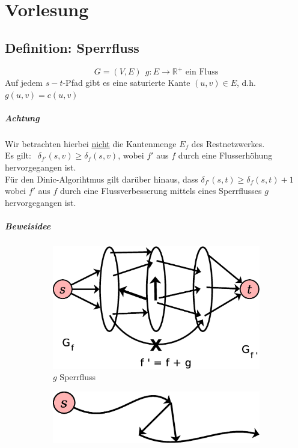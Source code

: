 \chapter{Vorlesung}
\section{Definition: Sperrfluss}
\[ G=(V,E)~~g:E\rightarrow\mathbb{R}^+\text{ ein Fluss} \]
Auf jedem $s-t$-Pfad gibt es eine saturierte Kante $(u,v)\in E$, d.h. $g(u,v)=c(u,v)$
\paragraph{Achtung}
Wir betrachten hierbei \underline{nicht} die Kantenmenge $E_f$ des Restnetzwerkes.\\
Es gilt: $~~\delta_{f'}(s,v)\geq \delta_f(s,v)$, wobei $f'$ aus $f$ durch eine Flusserhöhung hervorgegangen ist.\\
Für den Dinic-Algorihtmus gilt darüber hinaus, dass $\delta_{f'}(s,t) \geq \delta_f(s,t)+1$ wobei $f'$ aus $f$ durch eine Flussverbesserung mittels eines Sperrflusses $g$ hervorgegangen ist.
\paragraph{Beweisidee}
\begin{figure}[h]
\centering
\begin{subfigure}[H]{0.4\linewidth}
	\centering
\includegraphics[width=\linewidth]{27/Grafik/Diagramm2}
\caption{$g$ Sperrfluss}
\label{fig:Diagramm2}
\end{subfigure}
\hspace*{60pt}
\begin{subfigure}[H]{0.4\linewidth}
	\centering
	\includegraphics[width=\linewidth]{27/Grafik/Diagramm3}
	\caption{}
	\label{fig:Diagramm3}
\end{subfigure}
\end{figure}
